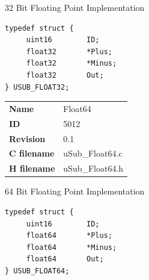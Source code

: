 32 Bit Floating Point Implementation

\begin{lstlisting}
typedef struct {
     uint16        ID;
     float32       *Plus;
     float32       *Minus;
     float32       Out;
} USUB_FLOAT32;
\end{lstlisting}

\ifdefined \AddTestReports
{}
\fi
{}
\nopagebreak[0]
\begin{tabular}{l l}
\textbf{Name} & Float64 \tabularnewline
\textbf{ID} & 5012 \tabularnewline
\textbf{Revision} & 0.1 \tabularnewline
\textbf{C filename} & uSub\_Float64.c \tabularnewline
\textbf{H filename} & uSub\_Float64.h \tabularnewline
\end{tabular}
\vspace{1ex}

64 Bit Floating Point Implementation

\begin{lstlisting}
typedef struct {
     uint16        ID;
     float64       *Plus;
     float64       *Minus;
     float64       Out;
} USUB_FLOAT64;
\end{lstlisting}

\ifdefined \AddTestReports
{}
\fi
